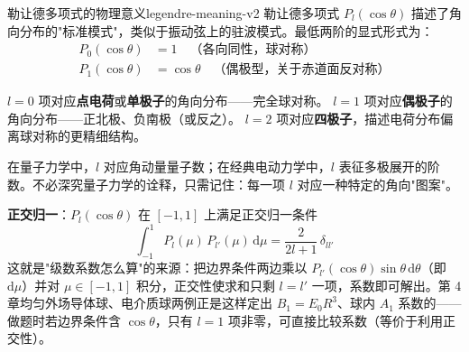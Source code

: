 \documentclass[11pt,a4paper,openany,oneside]{book}
\newcommand{\diff}{\mathrm{d}}
\begin{document}
\begin{insight}{勒让德多项式的物理意义}{legendre-meaning-v2}
勒让德多项式 $P_l(\cos\theta)$ 描述了角向分布的"标准模式"，类似于振动弦上的驻波模式。最低两阶的显式形式为：
\begin{align*}
P_0(\cos\theta) &= 1 \quad \text{（各向同性，球对称）} \\
P_1(\cos\theta) &= \cos\theta \quad \text{（偶极型，关于赤道面反对称）}
\end{align*}

$l=0$ 项对应\textbf{点电荷}或\textbf{单极子}的角向分布——完全球对称。
$l=1$ 项对应\textbf{偶极子}的角向分布——正北极、负南极（或反之）。
$l=2$ 项对应\textbf{四极子}，描述电荷分布偏离球对称的更精细结构。

在量子力学中，$l$ 对应角动量量子数；在经典电动力学中，$l$ 表征多极展开的阶数。不必深究量子力学的诠释，只需记住：每一项 $l$ 对应一种特定的角向"图案"。

\textbf{正交归一}：$P_l(\cos\theta)$ 在 $[-1,1]$ 上满足正交归一条件
\[
\int_{-1}^{1} P_l(\mu)\,P_{l'}(\mu)\,\diff\mu = \frac{2}{2l+1}\,\delta_{ll'}
\]
这就是"级数系数怎么算"的来源：把边界条件两边乘以 $P_{l'}(\cos\theta)\sin\theta\,\diff\theta$（即 $\diff\mu$）并对 $\mu\in[-1,1]$ 积分，正交性使求和只剩 $l = l'$ 一项，系数即可解出。第 4 章均匀外场导体球、电介质球两例正是这样定出 $B_1 = E_0R^3$、球内 $A_1$ 系数的——做题时若边界条件含 $\cos\theta$，只有 $l=1$ 项非零，可直接比较系数（等价于利用正交性）。
\end{insight}
\end{document}

